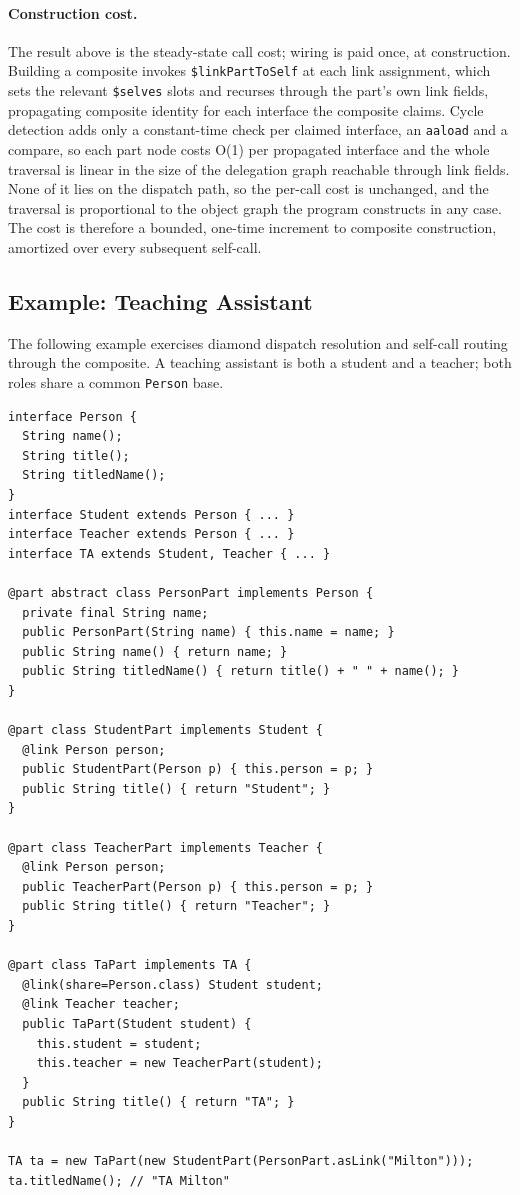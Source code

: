 \documentclass[sigplan,10pt,review,anonymous]{acmart}
\theoremstyle{acmplain}
\newcommand{\code}[1]{\texttt{#1}}
\begin{document}
\paragraph{Construction cost.}
The result above is the steady-state call cost; wiring is paid once, at
construction. Building a composite invokes \code{\$linkPartToSelf} at each link
assignment, which sets the relevant \code{\$selves} slots and recurses through the
part's own link fields, propagating composite identity for each interface the
composite claims. Cycle detection adds only a constant-time check per claimed
interface, an \code{aaload} and a compare, so each part node costs O(1) per
propagated interface and the whole traversal is linear in the size of the
delegation graph reachable through link fields. None of it lies on the dispatch
path, so the per-call cost is unchanged, and the traversal is proportional to the
object graph the program constructs in any case. The cost is therefore a bounded,
one-time increment to composite construction, amortized over every subsequent
self-call.

\subsection{Example: Teaching Assistant}

The following example exercises diamond dispatch resolution and self-call
routing through the composite. A teaching assistant is both
a student and a teacher; both roles share a common \code{Person} base.

\begin{lstlisting}
interface Person {
  String name();
  String title();
  String titledName();
}
interface Student extends Person { ... }
interface Teacher extends Person { ... }
interface TA extends Student, Teacher { ... }

@part abstract class PersonPart implements Person {
  private final String name;
  public PersonPart(String name) { this.name = name; }
  public String name() { return name; }
  public String titledName() { return title() + " " + name(); }
}

@part class StudentPart implements Student {
  @link Person person;
  public StudentPart(Person p) { this.person = p; }
  public String title() { return "Student"; }
}

@part class TeacherPart implements Teacher {
  @link Person person;
  public TeacherPart(Person p) { this.person = p; }
  public String title() { return "Teacher"; }
}

@part class TaPart implements TA {
  @link(share=Person.class) Student student;
  @link Teacher teacher;
  public TaPart(Student student) {
    this.student = student;
    this.teacher = new TeacherPart(student);
  }
  public String title() { return "TA"; }
}

TA ta = new TaPart(new StudentPart(PersonPart.asLink("Milton")));
ta.titledName(); // "TA Milton"
\end{lstlisting}
\end{document}
